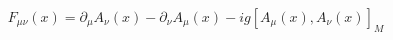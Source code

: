 \begin{equation}
F_{\mu\nu}(x)=\partial_{\mu}A_{\nu}(x)-\partial_{\nu}A_{\mu}(x)-ig[A_{\mu}(x),A_{\nu}(x)]_{M}
\end{equation}

